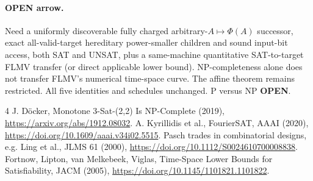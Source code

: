 \documentclass[11pt]{article}
\begin{document}
\paragraph{OPEN arrow.} Need a uniformly discoverable fully charged arbitrary-$A\mapsto\Phi(A)$ successor, exact all-valid-target hereditary power-smaller children and sound input-bit access, both SAT and UNSAT, plus a same-machine quantitative SAT-to-target FLMV transfer (or direct applicable lower bound). NP-completeness alone does not transfer FLMV's numerical time-space curve. The affine theorem remains restricted. All five identities and schedules unchanged. P versus NP \textbf{OPEN}.
\begin{thebibliography}{4}
 J. D\"ocker, Monotone 3-Sat-(2,2) Is NP-Complete (2019), \url{https://arxiv.org/abs/1912.08032}.
 A. Kyrillidis et al., FourierSAT, AAAI (2020), \url{https://doi.org/10.1609/aaai.v34i02.5515}.
 Pasch trades in combinatorial designs, e.g. Ling et al., JLMS 61 (2000), \url{https://doi.org/10.1112/S0024610700008838}.
 Fortnow, Lipton, van Melkebeek, Viglas, Time-Space Lower Bounds for Satisfiability, JACM (2005), \url{https://doi.org/10.1145/1101821.1101822}.
\end{thebibliography}
\end{document}
